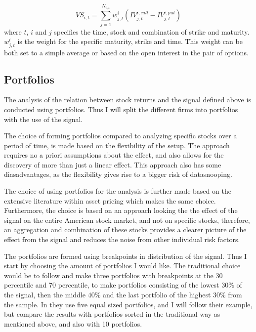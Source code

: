 \begin{equation}
	VS_{i,t} = \sum_{j=1}^{N_{i,t}}w_{j,t}^{i}\left(IV_{j,t}^{i,call}-IV_{j,t}^{i,put}\right)
\end{equation}
where $t$, $i$ and $j$ specifies the time, stock and combination of strike and maturity. $w_{j,t}^{i}$ is the weight for the specific maturity, strike and time. This weight can be both set to a simple average or based on the open interest in the pair of options.


\subsection{Portfolios}

The analysis of the relation between stock returns and the signal defined above is conducted using portfolios. Thus I will split the different firms into portfolios with the use of the signal. 

The choice of forming portfolios compared to analyzing specific stocks over a period of time,
is made based on the flexibility  of the setup. The approach requires no a priori assumptions about the effect, and also allows for the discovery of more than just a linear effect. This approach also has some diasadvantages, as the flexibility gives rise to a bigger risk of datasnooping. 

The choice of using portfolios for the analysis is further made based on the extensive literature within asset pricing which makes the same choice. Furthermore, the choice is based on an approach looking the the effect of the signal on the entire American stock market, and not on specific stocks, therefore, an aggregation and combination of these stocks provides a clearer picture of the effect from the signal and reduces the noise from other individual risk factors.

The portfolios are formed using breakpoints in distribution of the signal. Thus I start by choosing the amount of portfolios I would like. The traditional choice would be to follow \cite{} and make three portfolios with breakpoints at the 30 percentile and 70 percentile, to make portfolios consisting of the lowest 30\% of the signal, then the middle 40\%  and the last portfolio of the highest 30\% from the sample. In \cite{cremers2010deviations} they use five equal sized portfolios, and I will follow their example, but compare the results with portfolios sorted in the traditional way as mentioned above, and also with 10 portfolios. 

